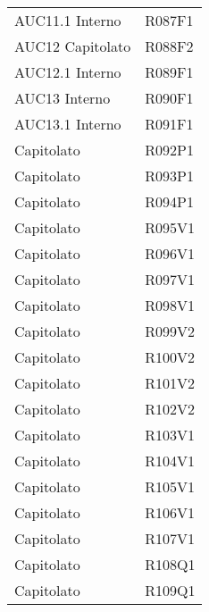 \documentclass[../analisi-dei-requisiti.tex]{subfiles}
\begin{document}
\begin{longtable}[H]{ p{4cm} | p{4cm} }
  AUC11.1 Interno               & R087F1                               \\
  AUC12 Capitolato              & R088F2                               \\
  AUC12.1 Interno               & R089F1                               \\
  AUC13 Interno                 & R090F1                               \\
  AUC13.1 Interno               & R091F1                               \\
  Capitolato                    & R092P1                               \\
  Capitolato                    & R093P1                               \\
  Capitolato                    & R094P1                               \\
  Capitolato                    & R095V1                               \\
  Capitolato                    & R096V1                               \\
  Capitolato                    & R097V1                               \\
  Capitolato                    & R098V1                               \\
  Capitolato                    & R099V2                               \\
  Capitolato                    & R100V2                               \\
  Capitolato                    & R101V2                               \\
  Capitolato                    & R102V2                               \\
  Capitolato                    & R103V1                               \\
  Capitolato                    & R104V1                               \\
  Capitolato                    & R105V1                               \\
  Capitolato                    & R106V1                               \\
  Capitolato                    & R107V1                               \\
  Capitolato                    & R108Q1                               \\
  Capitolato                    & R109Q1                               \\

\end{longtable}
\end{document}
